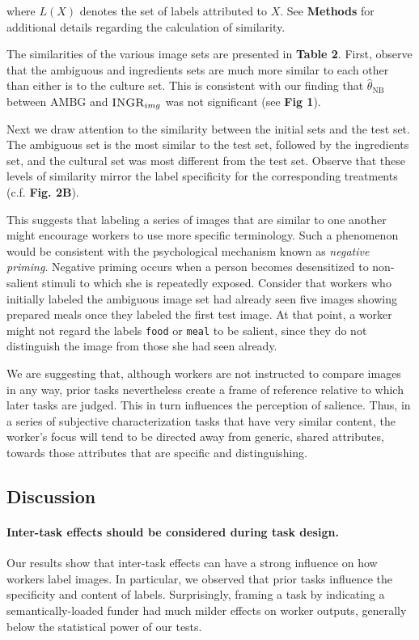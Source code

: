 \documentclass[letterpaper,twocolumn]{article}
\begin{document}
where $L(X)$ denotes the set of labels attributed to $X$.  See \textbf{Methods}
for additional details regarding the calculation of similarity.

The similarities of the various image sets are presented in \textbf{Table 2}. 
First, observe that the ambiguous and ingredients sets are much more similar 
to each other than either is to the culture set.  This is consistent with our
finding that $\hat{\theta}_\text{NB}$ between \textsc{AMBG} and 
$\textsc{INGR}_{img}$ was not significant (see \textbf{Fig 1}).

Next we draw attention to the similarity between the initial sets and the test 
set.  The ambiguous set is the most similar to the test set, followed by the
ingredients set, and the cultural set was most different from the test set.
Observe that these levels of similarity mirror the label specificity for the 
corresponding treatments (c.f. \textbf{Fig. 2B}).  

This suggests that labeling a series of images that are similar to 
one another might encourage workers to use more specific terminology.
Such a phenomenon would be consistent with the psychological mechanism known 
as \textit{negative priming}.  Negative priming occurs when a person becomes 
desensitized to non-salient stimuli to which she is repeatedly 
exposed.  Consider that workers who initially 
labeled the ambiguous image set had already seen five images showing 
prepared meals once they labeled the first test image.  At that point,
a worker might not regard the labels \texttt{food} or \texttt{meal} to be 
salient, since they do not distinguish the image from those she had seen 
already.

We are suggesting that, although workers are not instructed to compare
images in any way, prior tasks nevertheless create a frame of reference
relative to which later tasks are judged.  This in turn 
influences the perception of salience. Thus, in a series of subjective 
characterization tasks that have very similar content, the worker's focus 
will tend to be directed away from generic, shared attributes, towards those 
attributes that are specific and distinguishing.


\subsection*{Discussion}

\paragraph{Inter-task effects should be considered during task design.}  
Our results show that inter-task effects can have a strong influence on how
workers label images.  In particular, we observed that prior tasks influence
the specificity and content of labels.  Surprisingly, framing a task by 
indicating a semantically-loaded funder had much milder effects on worker 
outputs, generally below the statistical power of our tests.
\end{document}
